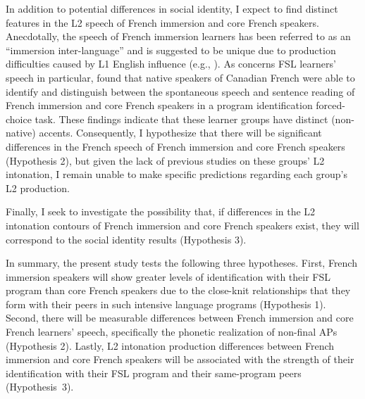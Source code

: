\documentclass[output=paper,colorlinks,citecolor=brown,draftmode]{langscibook}
\begin{document}
In addition to potential differences in social identity, I expect to find distinct features in the L2 speech of French immersion and core French speakers. Anecdotally, the speech of French immersion learners has been referred to as an “immersion inter-language” \citep{Lyster1987} and is suggested to be unique due to production difficulties caused by L1 English influence (e.g., \citealt{Genesee1978, Lyster1987}). As concerns FSL learners’ speech in particular, \citet{Poljak:2015} found that native speakers of Canadian French were able to identify and distinguish between the spontaneous speech and sentence reading of French immersion and core French speakers in a program identification forced-choice task. These findings indicate that these learner groups have distinct (non-native) accents. Consequently, I hypothesize that there will be significant differences in the French speech of French immersion and core French speakers (Hypothesis 2), but given the lack of previous studies on these groups’ L2 intonation, I remain unable to make specific predictions regarding each group’s L2 production.


Finally, I seek to investigate the possibility that, if differences in the L2 intonation contours of French immersion and core French speakers exist, they will correspond to the social identity results (Hypothesis 3).


In summary, the present study tests the following three hypotheses. First, French immersion speakers will show greater levels of identification with their FSL program than core French speakers due to the close-knit relationships that they form with their peers in such intensive language programs (Hypothesis 1). Second, there will be measurable differences between French immersion and core French learners’ speech, specifically the phonetic realization of non-final APs (Hypothesis 2). Lastly, L2 intonation production differences between French immersion and core French speakers will be associated with the strength of their identification with their FSL program and their same-program peers (Hypothesis~3).
\end{document}
